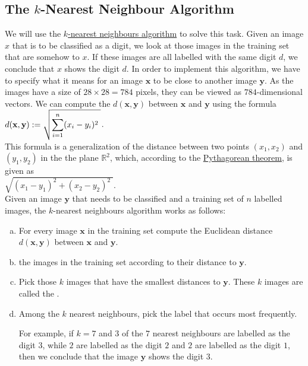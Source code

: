 \subsection{The $k$-Nearest Neighbour Algorithm}
We will use the \href{https://en.wikipedia.org/wiki/K-nearest_neighbors_algorithm}{$k$-nearest neighbours algorithm} 
to solve this task.  Given an image $x$ that is to be classified as a digit, we look at those images in the
training set that are somehow  to $x$.  If these images are all labelled with the same digit $d$,
we conclude that $x$ shows the digit $d$.  In order to implement this algorithm, we have to specify what it
means for an image $\mathbf{x}$ to be close to another image $\mathbf{y}$.  As the images have a size of $28 \times 28 = 784$
pixels, they can be viewed as $784$-dimensional vectors.  We can compute the 
$d(\mathbf{x}, \mathbf{y})$ between $\mathbf{x}$ and $\mathbf{y}$ using the formula
\\[0.2cm]
\hspace*{1.3cm}
$\displaystyle d(\mathbf{x}, \mathbf{y}) := \sqrt{\sum\limits_{i=1}^n (x_i - y_i)^2\;}$.
\\[0.2cm]
This formula is a generalization of the distance between two points $(x_1, x_2)$ and $(y_1, y_2)$ in the the
plane $\mathbb{R}^2$, which, according to the \href{https://en.wikipedia.org/wiki/Pythagorean_theorem}{Pythagorean theorem}, is given as 
\\[0.2cm]
\hspace*{1.3cm}
$\sqrt{(x_1 - y_1)^2 + (x_2 - y_2)^2\;}$.
\\[0.2cm]
Given an image $\mathbf{y}$ that needs to be classified and a training set of $n$ labelled images, the $k$-nearest
neighbours algorithm works as follows: 
\begin{enumerate}[(a)]
\item For every image $\mathbf{x}$ in the training set compute the Euclidean distance $d(\mathbf{x},
  \mathbf{y})$ between $\mathbf{x}$ and $\mathbf{y}$.
\item {} the images in the training set according to their distance to $\mathbf{y}$.
\item Pick those $k$ images that have the smallest distances to $\mathbf{y}$.
      These $k$ images are called the .
\item Among the $k$ nearest neighbours, pick the label that occurs most frequently.
      
      For example, if $k=7$ and $3$ of the $7$ nearest neighbours are labelled as the digit $3$, while $2$ are
      labelled as the digit $2$ and $2$ are labelled as the digit $1$, then we conclude that the image
      $\mathbf{y}$ shows the digit $3$. 
\end{enumerate}

